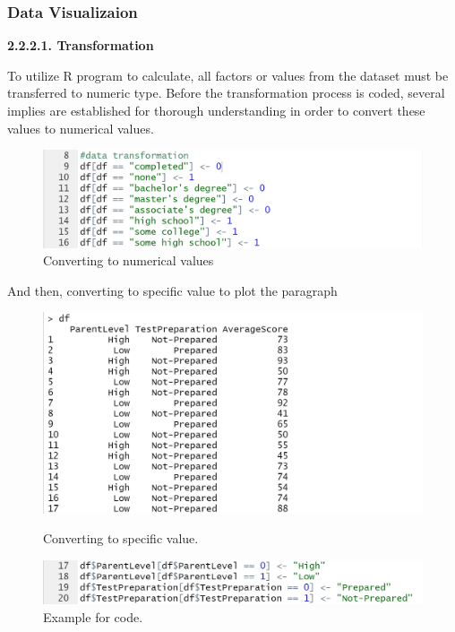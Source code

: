 \documentclass[a4paper]{article}
\begin{document}
\subsubsection{Data Visualizaion}
\vspace{0.4cm}
\textbf{2.2.2.1. Transformation} \\ \newline
{}
To utilize R program to calculate, all factors or values from the dataset must be transferred to
numeric type. Before the transformation process is coded, several implies are established for thorough
understanding in order to convert these values to numerical values.
\begin{figure}[H]
    \centering
    \includegraphics[scale = 0.7]{Images/Activity2/4.png}
    \caption{Converting to numerical values}
    \label{fig:Trans1}
\end{figure}
And then, converting to specific value to plot the paragraph
\begin{figure}[H]
    \centering
    \begin{minipage}{0.5\textwidth}
        \centering
        \includegraphics[width = 1.3\linewidth]{Images/Activity2/6.png}
        \caption{Converting to specific value.}
        \label{fig:trans3}
    \end{minipage}%
    \begin{minipage}{0.5\textwidth}
        \centering
        \includegraphics[width = 1.2\linewidth]{Images/Activity2/5.png}
        \caption{Example for code.}
        \label{fig:trans2}
    \end{minipage}
\end{figure}
\end{document}

